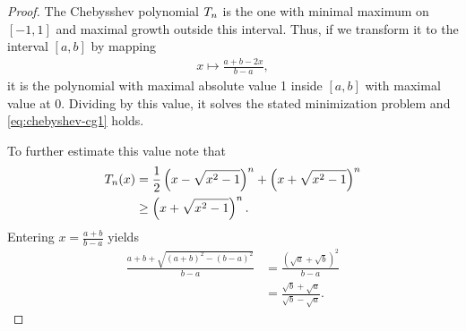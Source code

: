 \begin{proof}
  The Chebysshev polynomial $T_n$ is the one with minimal maximum on $[-1,1]$ and maximal growth outside this interval. Thus, if we transform it to the interval $[a,b]$ by mapping
  \begin{gather}
    x \mapsto \frac{a+b-2x}{b-a},
  \end{gather}
  it is the polynomial with maximal absolute value 1 inside $[a,b]$
  with maximal value at 0. Dividing by this value, it solves the
  stated minimization problem and \eqref{eq:chebyshev-cg1} holds.

  To further estimate this value note that
  \begin{align}
    T_n(x)
    &= \frac12
      \left(x-\sqrt{x^2-1}\right)^n
      +
      \left(x+\sqrt{x^2-1}\right)^n\\
    &\ge \left(x+\sqrt{x^2-1}\right)^n.
  \end{align}
  Entering $x = \frac{a+b}{b-a}$ yields
  \begin{align}
    \frac{a+b+\sqrt{(a+b)^2-(b-a)^2}}{b-a}
    &= \frac{(\sqrt a + \sqrt b)^2}{b-a}\\
    &= \frac{\sqrt b + \sqrt a}{\sqrt b-\sqrt a}.
  \end{align}
\end{proof}



\printindex

